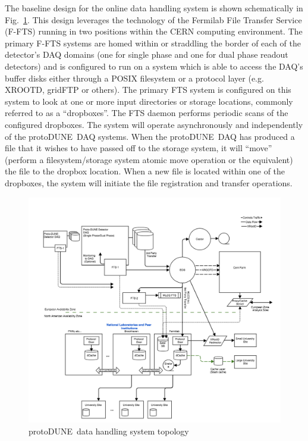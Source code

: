 \documentclass[pdftex,12pt,letter]{article}
\newcommand{\pd}{protoDUNE\ }
\begin{document}
The baseline design for the online data handling system is shown schematically in Fig.~\ref{fig:sys_topology}.  This design leverages the technology of the Fermilab File Transfer Service (F-FTS) running in two positions within the CERN computing environment. The  primary F-FTS systems are homed within or straddling the border of each of the detector’s DAQ domains (one for single phase and one for dual phase readout detectors) and is configured to run on a system which is able to access the DAQ’s buffer disks either through a POSIX filesystem or a protocol layer (e.g. XROOTD, gridFTP or others).  The primary FTS system is configured on this system to look at one or more input directories or storage locations, commonly referred to as a “dropboxes”.  The FTS daemon performs periodic scans of the configured dropboxes.  The system will operate asynchronously and independently of the \pd DAQ systems.  When the \pd DAQ has produced a file that it wishes to have passed off to the storage system, it will “move” (perform a filesystem/storage system atomic move operation or the equivalent) the file to the dropbox location. When a new file is located within one of the dropboxes, the system will initiate the file registration and transfer operations.
\begin{figure}[tbh]
\centering\includegraphics[width=0.99\linewidth]{protDune-datahandling-topology.png}
\caption{\label{fig:sys_topology}\pd data handling system topology}
\end{figure}
\end{document}
